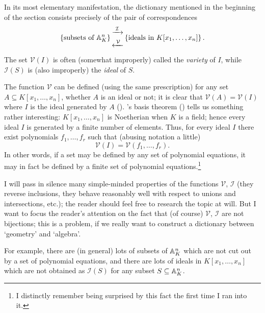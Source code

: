 In its most elementary manifestation, the dictionary mentioned in the
beginning of the section consists precisely of the pair of
correspondences
\[
  \left\{\text{subsets of }\mathbb{A}^n_K\right\}
  \begin{matrix}
    \xrightarrow{\;\mathcal{I}\;} \\[3pt]
    \xleftarrow{\;\mathcal{V}\;}
  \end{matrix}
  \left\{\text{ideals in }K[x_1,\dots,x_n]\right\}.
\]
The set $\mathcal{V}(I)$ is often (somewhat improperly) called the
\emph{variety} of $I$, while $\mathcal{I}(S)$ is (also improperly) the
\emph{ideal} of $S$.

The function $\mathcal{V}$ can be defined (using the same
prescription) for any set $A \subseteq K[x_1, \dots, x_n]$, whether
$A$ is an ideal or not; it is clear that
$\mathcal{V}(A) = \mathcal{V}(I)$ where $I$ is the ideal generated by
$A$
(). 's
basis theorem () tells us something rather
interesting: $K[x_1, \dots, x_n]$ is Noetherian when $K$ is a field;
hence every ideal $I$ is generated by a finite number of
elements. Thus, for every ideal $I$ there exist polynomials
$f_1, \dots, f_r$ such that (abusing notation a little)
\[
  \mathcal{V}(I) = \mathcal{V}(f_1, \dots, f_r).
\]
In other words, if a set may be defined by any set of polynomial
equations, it may in fact be defined by a finite set of polynomial
equations.\footnote{I distinctly remember being surprised by this fact
  the first time I ran into it.}

I will pass in silence many simple-minded properties of the functions
$\mathcal{V}$, $\mathcal{I}$ (they reverse inclusions, they behave
reasonably well with respect to unions and intersections, etc.); the
reader should feel free to research the topic at will. But I want to
focus the reader's attention on the fact that (of course)
$\mathcal{V}$, $\mathcal{I}$ are not bijections; this is a problem, if
we really want to construct a dictionary between `geometry' and
`algebra'.

For example, there are (in general) lots of subsets of $\mathbb{A}^n_K$ which
are not cut out by a set of polynomial equations, and there are lots
of ideals in $K[x_1, \dots, x_n]$ which are not obtained as
$\mathcal{I}(S)$ for any subset $S \subseteq \mathbb{A}^n_K$.

